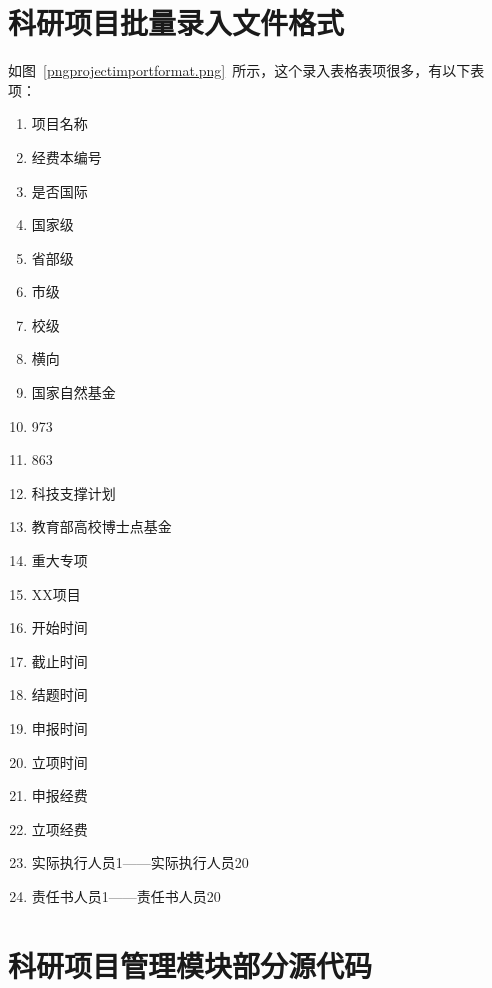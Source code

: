 \chapter{科研项目批量录入文件格式}
\label{projectimportformat}
如图~\ref{pngprojectimportformat.png}~所示，这个录入表格表项很多，有以下表项：
\begin{enumerate}
\item 项目名称
\item 经费本编号
\item 是否国际
\item 国家级
\item 省部级
\item 市级
\item 校级
\item 横向
\item 国家自然基金
\item 973
\item 863
\item 科技支撑计划
\item 教育部高校博士点基金
\item 重大专项
\item XX项目
\item 开始时间
\item 截止时间
\item 结题时间
\item 申报时间
\item 立项时间
\item 申报经费
\item 立项经费
\item 实际执行人员1——实际执行人员20
\item 责任书人员1——责任书人员20
\end{enumerate}

\chapter{科研项目管理模块部分源代码}
